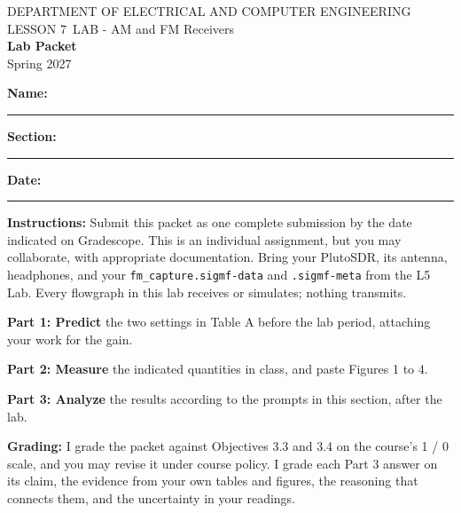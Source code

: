 \documentclass{exam}
\def\labLesson{7}
\def\thisterm{\thisTermIn}
\def\thisterm{Spring 2027}
\begin{document}
\pagestyle{headandfoot}
\begin{Form}

\begin{center}
DEPARTMENT OF ELECTRICAL AND COMPUTER ENGINEERING \\
LESSON \labLesson\ LAB - AM and FM Receivers \\
\textbf{Lab Packet} \\
\thisterm \\[4mm]
\end{center}

\vspace{-4pt}
\textbf{Name:} \rule[-2pt]{2.6in}{0.4pt} \hfill
\textbf{Section:} \rule[-2pt]{0.9in}{0.4pt} \hfill
\textbf{Date:} \rule[-2pt]{1.1in}{0.4pt}

\vspace{4pt}


\textbf{Instructions:} Submit this packet as one complete submission by the date indicated on
Gradescope. This is an individual assignment, but you may collaborate, with appropriate
documentation. Bring your PlutoSDR, its antenna, headphones, and your
\texttt{fm\_capture.sigmf-data} and \texttt{.sigmf-meta} from the L5 Lab. Every flowgraph
in this lab receives or simulates; nothing transmits.

\textbf{Part 1: Predict} the two settings in Table A before the lab period, attaching your
work for the gain.

\textbf{Part 2: Measure} the indicated quantities in class, and paste Figures 1 to 4.

\textbf{Part 3: Analyze} the results according to the prompts in this section, after the lab.

\textbf{Grading:} I grade the packet against Objectives 3.3 and 3.4 on the course's 1 / 0
scale, and you may revise it under course policy. I grade each Part 3 answer on its claim,
the evidence from your own tables and figures, the reasoning that connects them, and the
uncertainty in your readings.

\begin{procbox}
\end{procbox}


\end{Form}
\end{document}
